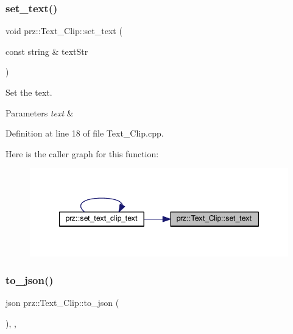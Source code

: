 \subsubsection{\texorpdfstring{set\_text()}{set\_text()}}
{\footnotesize\ttfamily void prz\+::\+Text\+\_\+\+Clip\+::set\+\_\+text (\begin{DoxyParamCaption}\item[{const string \&}]{text\+Str }\end{DoxyParamCaption})}



Set the text. 


\begin{DoxyParams}{Parameters}
{\em text} & \\
\hline
\end{DoxyParams}


Definition at line 18 of file Text\+\_\+\+Clip.\+cpp.

Here is the caller graph for this function\+:
\nopagebreak
\begin{figure}[H]
\begin{center}
\leavevmode
\includegraphics[width=347pt]{classprz_1_1_text___clip_a202deb59702755d44bcec29fc7e69f8c_icgraph}
\end{center}
\end{figure}
\mbox{\label{classprz_1_1_text___clip_a4e78e6e36c130ed42ec7f75772e3baed}} 
\subsubsection{\texorpdfstring{to\_json()}{to\_json()}}
{\footnotesize\ttfamily json prz\+::\+Text\+\_\+\+Clip\+::to\+\_\+json (\begin{DoxyParamCaption}{ }\end{DoxyParamCaption})\hspace{0.3cm}{\ttfamily [final]}, {\ttfamily [override]}, {\ttfamily [virtual]}}


